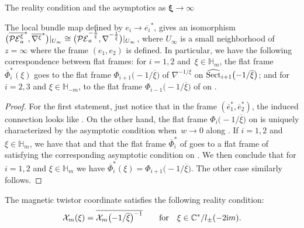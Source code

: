 \begin{subsubsection}{The reality condition and the asymptotics as $\boldsymbol{\xi \to \infty}$}
\begin{Lemma}
The local bundle map defined by $e_i\to \overline{e_i}^{*}$, gives an isomorphism $\smash{\bigl(\overline{\mathcal{PE}_a^{\xi}}^*,\overline{\nabla^{\xi}}^*\bigr)}|_{U_\infty}\allowbreak\cong \smash{\bigl(\mathcal{PE}_a^{-\frac{1}{\overline{\xi}}},\nabla^{-\frac{1}{\overline{\xi}}}\bigr)}|_{U_\infty}$, where $U_\infty$ is a small neighborhood of $z=\infty$ where the frame $(e_1,e_2)$ is defined. In particular, we have the following correspondence between flat frames: for $i=1,2$ and~${\xi \in \mathbb{H}_m}$, the flat frame $\overline{\Phi}_i^{*}(\xi)$ goes to the flat frame $\Phi_{i+1}\bigl(-1/\overline{\xi}\bigr)$ of $\nabla^{-1/\overline{\xi}}$ on $\widehat{\textnormal{Sect}}_{i+1}\bigl(-1/\overline{\xi}\bigr)$; and for~${i=2,3}$ and $\xi \in \mathbb{H}_{-m}$, to the flat frame $\Phi_{i-1}\bigl(-1/\overline{\xi}\bigr)$ of  on .
\end{Lemma}

\begin{proof}

For the first statement, just notice that in the frame $(\overline{e}_1^{*},\overline{e}_2^*)$, the induced connection looks like . On the other hand, the flat frame $\Phi_{i}\bigl(-1/\overline{\xi}\bigr)$ on  is uniquely characterized by the asymptotic condition  when~${w\to 0}$ along . If $i=1,2$ and $\xi \in \mathbb{H}_m$, we have that  and that the flat frame $\overline{\Phi}_i^{*}$ of \smash{$\overline{\nabla^{\xi}}^*$} goes to a flat frame of  satisfying the corresponding asymptotic condition on . We then conclude that for $i=1,2$ and $\xi \in \mathbb{H}_m$ we have $\overline{\Phi}^*_i(\xi)=\Phi_{i+1}\bigl(-1/\overline{\xi}\bigr)$. The other case similarly follows.
\end{proof}

\begin{Theorem}\label{rct}
The magnetic twistor coordinate satisfies the following reality condition:
\begin{equation*}
 \mathcal{X}_m(\xi)=\overline{\mathcal{X}_m\bigl(-1/\overline{\xi}\bigr)^{-1}} \qquad \text{for} \quad \xi \in \mathbb{C
 }^*/l_{\pm}(-2{\rm i}m).
\end{equation*}
\end{Theorem}


\end{subsubsection}
